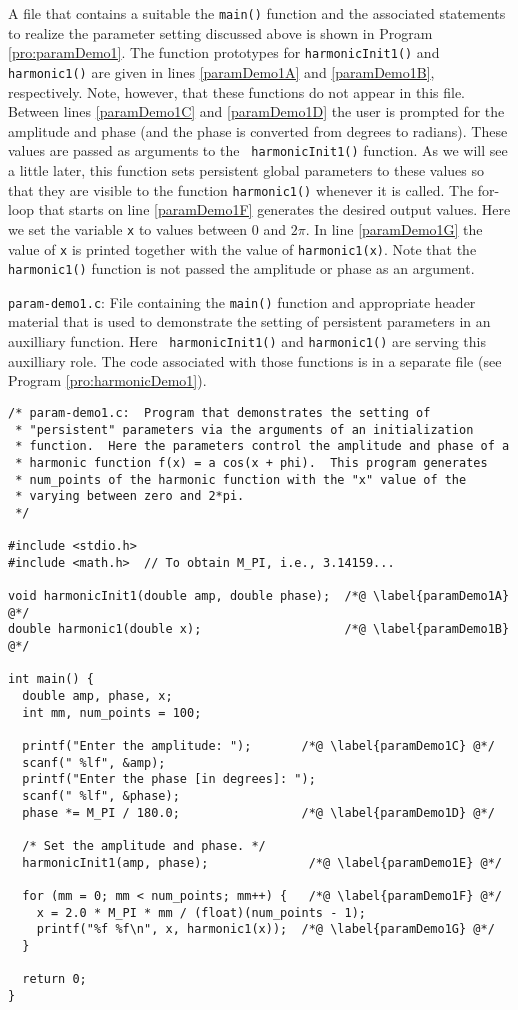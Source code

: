 A file that contains a suitable the {\tt main()} function and the
associated statements to realize the parameter setting discussed above
is shown in Program \ref{pro:paramDemo1}.  The function prototypes for
{\tt harmonicInit1()} and {\tt harmonic1()} are given in lines
\ref{paramDemo1A} and \ref{paramDemo1B}, respectively.  Note, however,
that these functions do not appear in this file.  Between lines
\ref{paramDemo1C} and \ref{paramDemo1D} the user is prompted for the
amplitude and phase (and the phase is converted from degrees to
radians).  These values are passed as arguments to the {\tt
  harmonicInit1()} function.  As we will see a little later, this
function sets persistent global parameters to these values so that
they are visible to the function {\tt harmonic1()} whenever it is
called.  The for-loop that starts on line \ref{paramDemo1F} generates
the desired output values.  Here we set the variable {\tt x} to values
between $0$ and $2\pi$.  In line \ref{paramDemo1G} the value of {\tt x}
is printed together with the value of {\tt harmonic1(x)}.  Note that
the {\tt harmonic1()} function is not passed the amplitude or phase as
an argument.

\begin{program}
{\tt param-demo1.c}: File containing the {\tt main()} function and
appropriate header material that is used to demonstrate the setting of
persistent parameters in an auxilliary function.  Here {\tt
  harmonicInit1()} and {\tt harmonic1()} are serving this auxilliary
role.  The code associated with those functions is in a separate
file (see Program \ref{pro:harmonicDemo1}).
\label{pro:paramDemo1}
\codemiddle
\begin{lstlisting}
/* param-demo1.c:  Program that demonstrates the setting of
 * "persistent" parameters via the arguments of an initialization
 * function.  Here the parameters control the amplitude and phase of a
 * harmonic function f(x) = a cos(x + phi).  This program generates
 * num_points of the harmonic function with the "x" value of the
 * varying between zero and 2*pi.
 */

#include <stdio.h>
#include <math.h>  // To obtain M_PI, i.e., 3.14159...

void harmonicInit1(double amp, double phase);  /*@ \label{paramDemo1A} @*/
double harmonic1(double x);                    /*@ \label{paramDemo1B} @*/

int main() {
  double amp, phase, x;
  int mm, num_points = 100;

  printf("Enter the amplitude: ");       /*@ \label{paramDemo1C} @*/
  scanf(" %lf", &amp);
  printf("Enter the phase [in degrees]: ");
  scanf(" %lf", &phase);
  phase *= M_PI / 180.0;                 /*@ \label{paramDemo1D} @*/

  /* Set the amplitude and phase. */
  harmonicInit1(amp, phase);              /*@ \label{paramDemo1E} @*/

  for (mm = 0; mm < num_points; mm++) {   /*@ \label{paramDemo1F} @*/
    x = 2.0 * M_PI * mm / (float)(num_points - 1);
    printf("%f %f\n", x, harmonic1(x));  /*@ \label{paramDemo1G} @*/
  }

  return 0;
}
\end{lstlisting}
\end{program}

